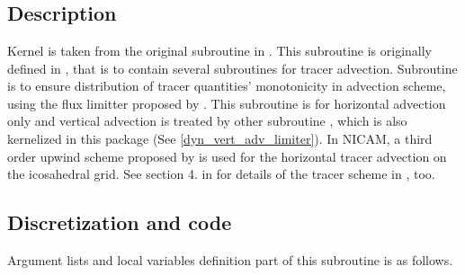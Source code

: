 \section{}
\label{dyn_horiz_adv_limiter}

\subsection{Description}

Kernel  is taken from the original subroutine
 in \NICAM.
%
This subroutine is originally defined in , that
is to contain several subroutines for tracer advection.
%
Subroutine  is to ensure distribution of
tracer quantities' monotonicity in advection scheme, using the flux
limitter proposed by \cite{Thuburn:1996in}.
%
This subroutine is for horizontal advection only and vertical advection
is treated by other subroutine , which is
also kernelized in this package (See \autoref{dyn_vert_adv_limiter}).
%
In NICAM, a third order upwind scheme proposed by \cite{Miura:2007bs} is used
for the horizontal tracer advection on the icosahedral grid.
See section 4. in \cite{Tomita2010ecmwf} for details of the tracer scheme in \NICAM, too.



\subsection{Discretization and code}

Argument lists and local variables definition part of this subroutine is
as follows.

